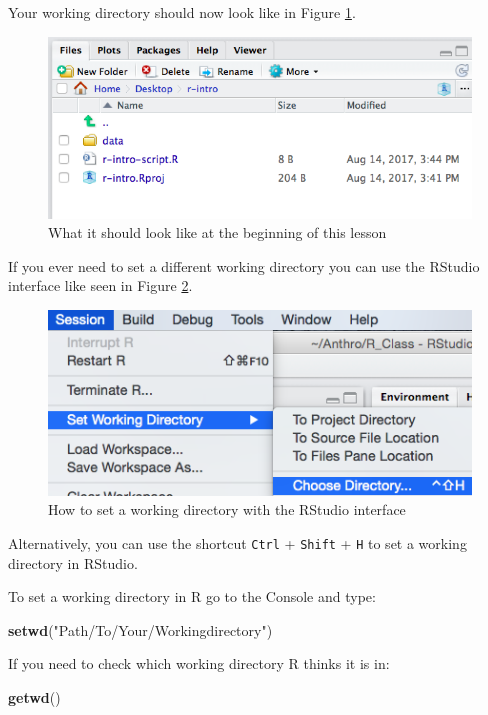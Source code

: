 \documentclass[]{book}
\newenvironment{Shaded}{\begin{snugshade}}{\end{snugshade}}
\newcommand{\KeywordTok}[1]{\textcolor[rgb]{0.13,0.29,0.53}{\textbf{#1}}}
\newcommand{\StringTok}[1]{\textcolor[rgb]{0.31,0.60,0.02}{#1}}
\newcommand{\NormalTok}[1]{#1}
\theoremstyle{definition}
\theoremstyle{definition}
\theoremstyle{definition}
\theoremstyle{remark}
\begin{document}
Your working directory should now look like in Figure
\ref{fig:working-dir}.

\begin{figure}
\includegraphics[width=0.6\linewidth]{img/Rproject-setup} \caption{What it should look like at the beginning of this lesson}\label{fig:working-dir}
\end{figure}

If you ever need to set a different working directory you can use the
RStudio interface like seen in Figure \ref{fig:set-working-dir}.

\begin{figure}
\includegraphics[width=0.6\linewidth]{img/setWD} \caption{How to set a working directory with the RStudio interface}\label{fig:set-working-dir}
\end{figure}

Alternatively, you can use the shortcut \texttt{Ctrl} + \texttt{Shift} +
\texttt{H} to set a working directory in RStudio.

To set a working directory in R go to the Console and type:

\begin{Shaded}
\begin{Highlighting}[]
\KeywordTok{setwd}\NormalTok{(}\StringTok{"Path/To/Your/Workingdirectory"}\NormalTok{)}
\end{Highlighting}
\end{Shaded}

If you need to check which working directory R thinks it is in:

\begin{Shaded}
\begin{Highlighting}[]
\KeywordTok{getwd}\NormalTok{()}
\end{Highlighting}
\end{Shaded}
\end{document}
